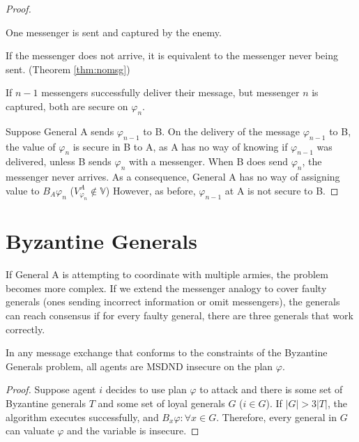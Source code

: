 \begin{proof}
\begin{case}
One messenger is sent and captured by the enemy.
\end{case}

If the messenger does not arrive, it is equivalent to the messenger never being sent. (Theorem \ref{thm:nomsg})

\begin{case}
If $n-1$ messengers successfully deliver their message, but messenger $n$ is captured, both are secure on $\varphi_{n}$.
\end{case}

Suppose General A sends $\varphi_{n-1}$ to B.
On the delivery of the message $\varphi_{n-1}$ to B, the value of $\varphi_{n}$ is secure in B to A, as A has no way of knowing if $\varphi_{n-1}$ was delivered, unless B sends $\varphi_{n}$ with a messenger.
When B does send $\varphi_{n}$, the messenger never arrives.
As a consequence, General A has no way of assigning value to $B_A \varphi_n$ ($V_{\varphi_n}^A \not \in \mathbb{V}$)
However, as before, $\varphi_{n-1}$ at A is not secure to B.
\end{proof}

\section{Byzantine Generals}

If General A is attempting to coordinate with multiple armies, the problem becomes more complex.
If we extend the messenger analogy to cover faulty generals (ones sending incorrect information or omit messengers), the generals can reach consensus if for every faulty general, there are three generals that work correctly.\cite{byzantine-generals}

\begin{thm}
In any message exchange that conforms to the constraints of the Byzantine Generals problem, all agents are MSDND insecure on the plan $\varphi$.
\end{thm}

\begin{proof}
Suppose agent $i$ decides to use plan $\varphi$ to attack and there is some set of Byzantine generals $T$ and some set of loyal generals $G$ ($i \in G$). If $|G| > 3|T|$, the algorithm executes successfully, and $B_x \varphi : \forall x \in G$. Therefore, every general in $G$ can valuate $\varphi$ and the variable is insecure.
\end{proof}

